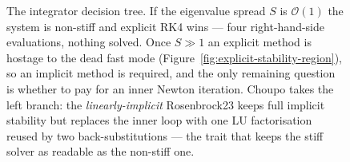 \documentclass[11pt,a4paper]{article}
\begin{document}
\begin{figure}[ht]
\caption{The integrator decision tree.  If the eigenvalue spread $S$ is
$\mathcal{O}(1)$ the system is non-stiff and explicit RK4 wins --- four
right-hand-side evaluations, nothing solved.  Once $S\gg1$ an explicit
method is hostage to the dead fast mode (Figure~\ref{fig:explicit-stability-region}),
so an implicit method is required, and the only remaining question is
whether to pay for an inner Newton iteration.  Choupo takes the
left branch: the \emph{linearly-implicit} Rosenbrock23 keeps full
implicit stability but replaces the inner loop with one LU factorisation
reused by two back-substitutions --- the trait that keeps the stiff
solver as readable as the non-stiff one.}
\label{fig:integrator-decision-tree}
\end{figure}
\end{document}
